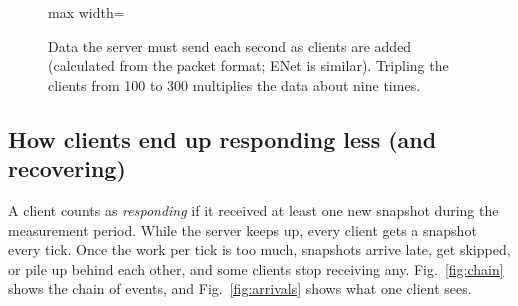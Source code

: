 \IfFileExists{IEEEtran.cls}{\ieeetrue\documentclass[conference]{IEEEtran}}{\ieeefalse\documentclass[twocolumn,10pt]{article}}
\begin{document}
\begin{figure}[H]
\centering
\begin{adjustbox}{max width=\columnwidth}\end{adjustbox}
\caption{Data the server must send each second as clients are added (calculated
from the packet format; ENet is similar). Tripling the clients from 100 to 300
multiplies the data about nine times.}
\label{fig:growth}
\end{figure}

\subsection{How clients end up responding less (and recovering)}\label{sec:chain}
A client counts as \textit{responding} if it received at least one new snapshot during the
measurement period. While the server keeps up, every client gets a snapshot every
tick. Once the work per tick is too much, snapshots arrive late, get skipped, or
pile up behind each other, and some clients stop receiving any. Fig.~\ref{fig:chain}
shows the chain of events, and Fig.~\ref{fig:arrivals} shows what one client sees.
\end{document}
